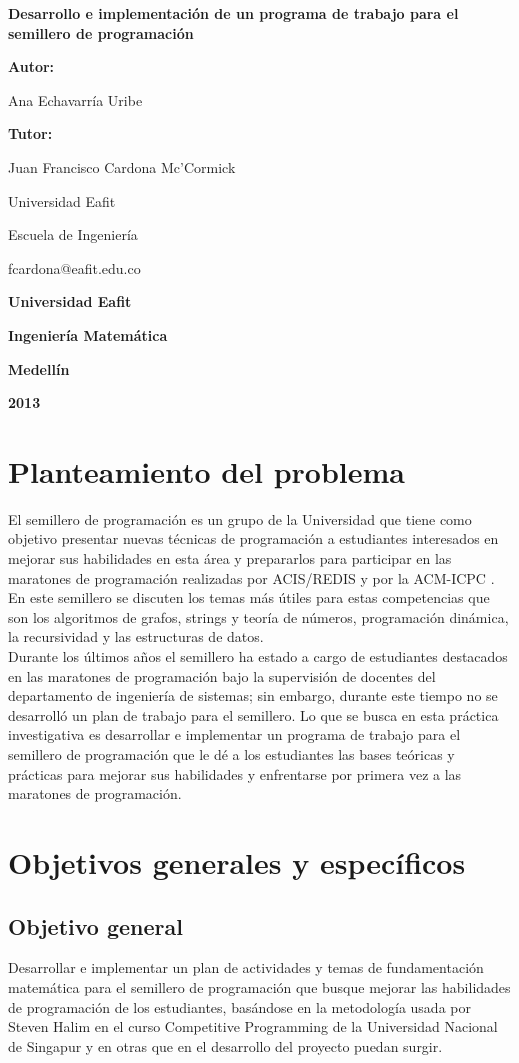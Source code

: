 \documentclass[11pt, oneside]{article}
\makeatletter
\theoremstyle{definition}
\theoremstyle{remark}
\newcommand\portada{
\begin{titlepage}
		\begin{center}
			{\large \bf Desarrollo e implementación de un programa de trabajo para el semillero de programación}
			\vfill
			{\large\bf Autor: \par}
			{\large Ana Echavarría Uribe\par}
			{\large\bf Tutor: \par}
			{\large Juan Francisco Cardona Mc'Cormick \par Universidad Eafit \par Escuela de Ingeniería \par fcardona@eafit.edu.co }
			\vfill
			{\large\bf Universidad Eafit  \par}
			{\large\bf Ingeniería Matemática \par}
			{\large\bf Medellín\par}
			{\large\bf 2013 \par}
		\end{center}
\end{titlepage}
}
\makeatother
\begin{document}
\portada


\renewcommand\contentsname{\centering Tabla de contenidos}
\tableofcontents
\clearpage

\section{Planteamiento del problema}
El semillero de programación es un grupo de la Universidad que tiene como objetivo presentar nuevas técnicas de programación a estudiantes interesados en mejorar sus habilidades en esta área y prepararlos para participar en las maratones de programación realizadas por ACIS/REDIS \cite{ACIS} y por la ACM-ICPC \cite{ICPC}. En este semillero se discuten los temas más útiles \cite{ProgrammingChallenges, Halim, Halim2, Brasil} para estas competencias que son los algoritmos de grafos, strings y teoría de números, programación dinámica, la recursividad y las estructuras de datos.\\
Durante los últimos años el semillero ha estado a cargo de estudiantes destacados en las maratones de programación bajo la supervisión de docentes del departamento de ingeniería de sistemas; sin embargo, durante este tiempo no se desarrolló un plan de trabajo para el semillero. Lo que se busca en esta práctica investigativa es desarrollar e implementar un programa de trabajo para el semillero de programación que le dé a los estudiantes las bases teóricas y prácticas para mejorar sus habilidades y enfrentarse por primera vez a las maratones de programación.

\section{Objetivos generales y específicos}

\subsection{Objetivo general}
Desarrollar e implementar un plan de actividades y temas de fundamentación matemática para el semillero de programación que busque mejorar las habilidades de programación de los estudiantes, basándose en la metodología usada por Steven Halim en el curso Competitive Programming de la Universidad Nacional de Singapur y en otras que en el desarrollo del proyecto puedan surgir.
\end{document}
